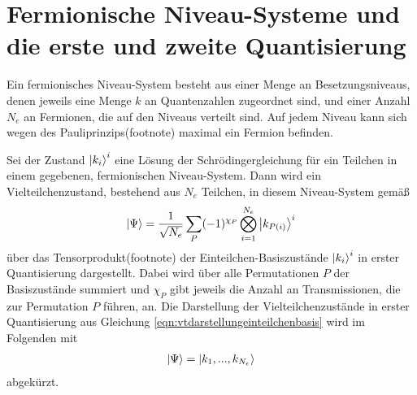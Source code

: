 \section{Fermionische Niveau-Systeme und die erste und zweite Quantisierung}

Ein fermionisches Niveau-System besteht aus einer Menge an Besetzungsniveaus, denen jeweils eine Menge $k$ an Quantenzahlen zugeordnet sind, und einer Anzahl $N_e$ an Fermionen, die auf den Niveaus verteilt sind.
Auf jedem Niveau kann sich wegen des Pauliprinzips(footnote) maximal ein Fermion befinden.

Sei der Zustand $\ket{k_i}^i$ eine Lösung der Schrödingergleichung für ein Teilchen in einem gegebenen, fermionischen Niveau-System.
Dann wird ein Vielteilchenzustand, bestehend aus $N_e$ Teilchen, in diesem Niveau-System gemäß
\begin{align}
  \ket{\Psi} = \frac{1}{\sqrt{N_e}} \sum_{P} (-1)^{\chi_P} \bigotimes\limits_{i=1}^{N_e} \ket{k_{P(i)}}^i
  \label{eqn:vtdarstellung1quant}
\end{align}
über das Tensorprodukt(footnote) der Einteilchen-Basiszustände $\ket{k_i}^i$ in erster Quantisierung dargestellt.
Dabei wird über alle Permutationen $P$ der Basiszustände summiert und $\chi_P$ gibt jeweils die Anzahl an Transmissionen, die zur Permutation $P$ führen, an.
Die Darstellung der Vielteilchenzustände in erster Quantisierung aus Gleichung \eqref{eqn:vtdarstellungeinteilchenbasis} wird im Folgenden mit
\begin{align}
  \ket{\Psi} = \ket{k_1,...,k_{N_e}}
  \label{eqn:vtdarstellung1quantkurz}
\end{align}
abgekürzt.

